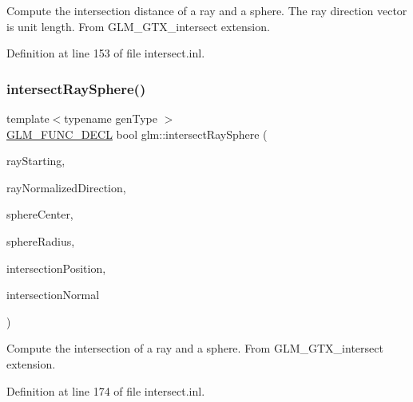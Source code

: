 Compute the intersection distance of a ray and a sphere. The ray direction vector is unit length. From G\+L\+M\+\_\+\+G\+T\+X\+\_\+intersect extension. 

Definition at line 153 of file intersect.\+inl.

\mbox{\label{group__gtx__intersect_gad28c00515b823b579c608aafa1100c1d}} 
\subsubsection{\texorpdfstring{intersect\+Ray\+Sphere()}{intersectRaySphere()}\hspace{0.1cm}{\footnotesize\ttfamily [2/2]}}
{\footnotesize\ttfamily template$<$typename gen\+Type $>$ \\
\hyperlink{setup_8hpp_ab2d052de21a70539923e9bcbf6e83a51}{G\+L\+M\+\_\+\+F\+U\+N\+C\+\_\+\+D\+E\+CL} bool glm\+::intersect\+Ray\+Sphere (\begin{DoxyParamCaption}\item[{gen\+Type const \&}]{ray\+Starting,  }\item[{gen\+Type const \&}]{ray\+Normalized\+Direction,  }\item[{gen\+Type const \&}]{sphere\+Center,  }\item[{const typename gen\+Type\+::value\+\_\+type}]{sphere\+Radius,  }\item[{gen\+Type \&}]{intersection\+Position,  }\item[{gen\+Type \&}]{intersection\+Normal }\end{DoxyParamCaption})}

Compute the intersection of a ray and a sphere. From G\+L\+M\+\_\+\+G\+T\+X\+\_\+intersect extension. 

Definition at line 174 of file intersect.\+inl.

\mbox{\label{group__gtx__intersect_gab16c1b47c10451e7604b51b39a7ef21d}} 
